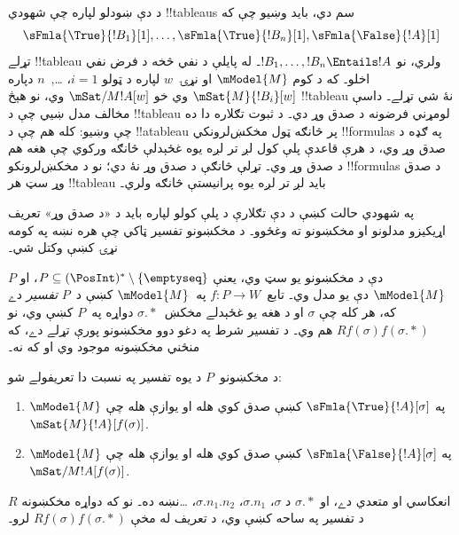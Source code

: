 \documentclass[../../../include/open-logic-section]{subfiles}
\begin{document}


\begin{explain}
  د دې ښودلو لپاره چې شهودي !!{tableau}s سم دي، بايد وښيو چې که
  \[
  \sFmla{\True}{!B_1}[1], \dots, \sFmla{\True}{!B_n}[1], \sFmla{\False}{!A}[1]
  \]
  تړلے !!{tableau} ولري، نو $!B_1, \dots, !B_n \Entails !A$۔
  له پايلې د نفي څخه د فرض نفي اخلو۔ که د کوم $\mModel{M}$ او نړۍ~$w$
  لپاره د ټولو $i=1$، \dots,~$n$ دپاره $\mSat{M}{!B_i}[w]$
  وي خو $\mSat/{M}{!A}[w]$ وي، نو هېڅ !!{tableau} نۀ شي تړلے۔
  داسې مخالف مدل ښيي چې د !!{tableau} لومړني
  فرضونه د صدق وړ دي۔ د ثبوت تګلاره دا ده چې وښيو: کله هم
  چې د !!a{tableau} پر څانګه ټول مخکښ‌لرونکي !!{formula}s په
  ګډه د صدق وړ وي، د هرې قاعدې پلې کول لږ تر لږه يوه غځېدلې
  څانګه ورکوي چې هغه هم د صدق وړ وي۔ تړلې څانګې د صدق وړ نۀ
  دي؛ نو د مخکښ‌لرونکو !!{formula}s د صدق وړ سټ هر
  !!{tableau} بايد لږ تر لږه يوه پرانيستې څانګه ولري۔

  په شهودي حالت کښې د دې تګلارې د پلې کولو لپاره بايد د
  «د صدق وړ» تعريف اړيکيزو مدلونو او مخکښونو ته وغځوو۔
  د مخکښونو تفسير ټاکي چې هره نښه په کومه نړۍ کښې وکتل شي۔
\end{explain}

\begin{defn}
  $P$ دې د مخکښونو يو سټ وي، يعنې $P \subseteq (\PosInt)^*
  \setminus \{\emptyseq\}$، او $\mModel{M}$ دې يو مدل وي۔
  تابع~$f\colon P \to W$ په~$\mModel{M}$ کښې د~$P$
  \emph{تفسير} دے که، هر کله چې $\sigma$ او د هغه يو
  غځېدلے مخکښ~$\sigma.{*}$ دواړه په~$P$ کښې وي، نو
  $Rf(\sigma)f(\sigma.{*})$ هم وي۔ د تفسير شرط په دغو دوو
  مخکښونو پورې تړلے دے، که منځني مخکښونه موجود وي او که نه۔

  د مخکښونو~$P$ د يوه تفسير په نسبت دا تعريفولے شو:
  \begin{enumerate}
  \item $\mModel{M}$ په $\sFmla{\True}{!A}[\sigma]$ کښې صدق کوي هله او يوازې هله چې
    $\mSat{M}{!A}[f(\sigma)]$.
  \item $\mModel{M}$ په $\sFmla{\False}{!A}[\sigma]$ کښې صدق کوي هله او يوازې هله چې
    $\mSat/{M}{!A}[f(\sigma)]$.
  \end{enumerate}
\end{defn}

$R$ انعکاسي او متعدي دے، او $\sigma.{*}$ د
$\sigma$، $\sigma.n_1$، $\sigma.n_1.n_2$، \dots نښه ده۔
نو که دواړه مخکښونه د تفسير په ساحه کښې وي، د تعريف له
مخې $Rf(\sigma)f(\sigma.{*})$ لرو۔
\end{document}
